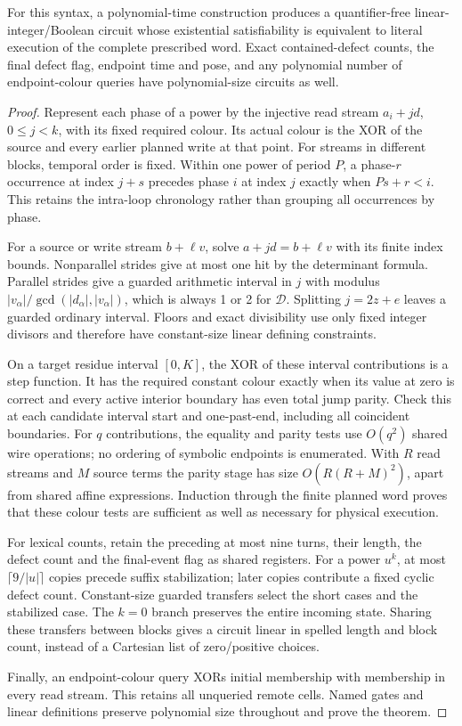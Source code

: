 \begin{theorem}
For this syntax, a polynomial-time construction produces a quantifier-free
linear-integer/Boolean circuit whose existential satisfiability is equivalent
to literal execution of the complete prescribed word. Exact contained-defect
counts, the final defect flag, endpoint time and pose, and any polynomial
number of endpoint-colour queries have polynomial-size circuits as well.
\end{theorem}
\begin{proof}
Represent each phase of a power by the injective read stream
$a_i+j d$, $0\le j<k$, with its fixed required colour. Its actual colour
is the XOR of the source and every earlier planned write at that point.
For streams in different blocks, temporal order is fixed. Within one
power of period $P$, a phase-$r$ occurrence at index $j+s$ precedes
phase $i$ at index $j$ exactly when $Ps+r<i$. This retains the intra-loop
chronology rather than grouping all occurrences by phase.

For a source or write stream $b+\ell v$, solve
$a+jd=b+\ell v$ with its finite index bounds. Nonparallel strides give at
most one hit by the determinant formula. Parallel strides give a guarded
arithmetic interval in $j$ with modulus
$|v_\alpha|/\gcd(|d_\alpha|,|v_\alpha|)$, which is always 1 or 2 for
$\mathcal D$. Splitting $j=2z+e$ leaves a guarded ordinary interval.
Floors and exact divisibility use only fixed integer divisors and therefore
have constant-size linear defining constraints.

On a target residue interval $[0,K]$, the XOR of these interval contributions
is a step function. It has the required constant colour exactly when its
value at zero is correct and every active interior boundary has even total
jump parity. Check this at each candidate interval start and one-past-end,
including all coincident boundaries. For $q$ contributions, the equality
and parity tests use $O(q^2)$ shared wire operations; no ordering of symbolic
endpoints is enumerated. With $R$ read streams and $M$ source terms the
parity stage has size $O(R(R+M)^2)$, apart from shared affine expressions.
Induction through the finite planned word proves that these colour tests
are sufficient as well as necessary for physical execution.

For lexical counts, retain the preceding at most nine turns, their length,
the defect count and the final-event flag as shared registers. For a power
$u^k$, at most $\lceil9/|u|\rceil$ copies precede suffix stabilization;
later copies contribute a fixed cyclic defect count. Constant-size guarded
transfers select the short cases and the stabilized case. The $k=0$ branch
preserves the entire incoming state. Sharing these transfers between blocks
gives a circuit linear in spelled length and block count, instead of a
Cartesian list of zero/positive choices.

Finally, an endpoint-colour query XORs initial membership with membership
in every read stream. This retains all unqueried remote cells. Named gates
and linear definitions preserve polynomial size throughout and prove the
theorem.
\end{proof}

